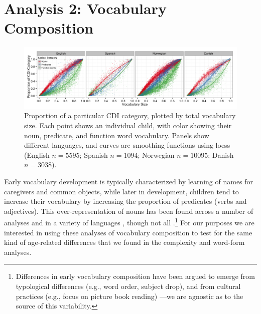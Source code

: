 \documentclass[10pt,letterpaper]{article}
\begin{document}
\section{Analysis 2: Vocabulary Composition}

\begin{figure}[t]
\begin{center}
\includegraphics[width=\textwidth]{plots/composition.png}
\end{center}
\caption{\label{fig:vocab_comp} Proportion of a particular CDI category, plotted by total vocabulary size. Each point shows an individual child, with color showing their noun, predicate, and function word vocabulary. Panels show different languages, and curves are smoothing functions using loess (English $n=5595$; Spanish $n=1094$; Norwegian $n=10095$; Danish $n=3038$).} 
\end{figure}

Early vocabulary development is typically characterized by learning of names for caregivers and common objects, while later in development, children tend to increase their vocabulary by increasing the proportion of predicates (verbs and adjectives). This over-representation of nouns has been found across a number of analyses and in a variety of languages \cite{bates1994}, though not all \cite{caselli1995}.\footnote{Differences in early vocabulary composition have been argued to emerge from typological differences (e.g., word order, subject drop), and from cultural practices (e.g., focus on picture book reading) \cite{tardif1999, gopnik1996, choi1995}---we are agnostic as to the source of this variability.}
For our purposes we are interested in using these analyses of vocabulary composition to test for the same kind of age-related differences that we found in the complexity and word-form analyses. 
\end{document}

